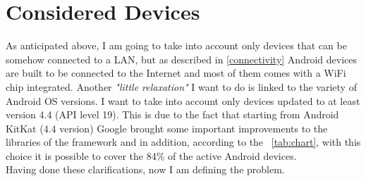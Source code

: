 \section{Considered Devices}
As anticipated above, I am going to take into account only devices that can be somehow connected to a LAN, but as described in \ref{connectivity} Android devices are built to be connected to the Internet and most of them comes with a WiFi chip integrated. Another \textit{"little relaxation"} I want to do is linked to the variety of Android OS versions. I want to take into account only devices updated to at least version 4.4 (API level 19). This is due to the fact that starting from Android KitKat (4.4 version) Google brought some important improvements  to the libraries of the framework and in addition, according to the \tablename~\ref{tab:chart}, with this choice it is possible to cover the 84\% of the active Android devices.\\
Having done these clarifications, now I am defining the problem.

